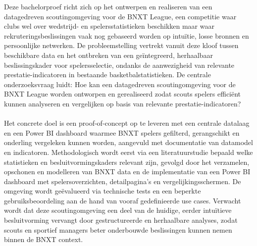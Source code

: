 Deze bachelorproef richt zich op het ontwerpen en realiseren van een datagedreven scoutingomgeving voor de BNXT League, een competitie waar clubs wel over wedstrijd- en spelersstatistieken beschikken maar waar rekruteringsbeslissingen vaak nog gebaseerd worden op intuïtie, losse bronnen en persoonlijke netwerken. De probleemstelling vertrekt vanuit deze kloof tussen beschikbare data en het ontbreken van een geïntegreerd, herhaalbaar beslissingskader voor spelersselectie, ondanks de aanwezigheid van relevante prestatie-indicatoren in bestaande basketbalstatistieken. De centrale onderzoeksvraag luidt: Hoe kan een datagedreven scoutingomgeving voor de BNXT League worden ontworpen en gerealiseerd zodat scouts spelers efficiënt kunnen analyseren en vergelijken op basis van relevante prestatie-indicatoren? 
\\\\
Het concrete doel is een proof‑of‑concept op te leveren met een centrale datalaag en een Power BI dashboard waarmee BNXT spelers gefilterd, gerangschikt en onderling vergeleken kunnen worden, aangevuld met documentatie van datamodel en indicatoren. Methodologisch wordt eerst via een literatuurstudie bepaald welke statistieken en besluitvormingskaders relevant zijn, gevolgd door het verzamelen, opschonen en modelleren van BNXT data en de implementatie van een Power BI dashboard met spelersoverzichten, detailpagina’s en vergelijkingsschermen. De omgeving wordt geëvalueerd via technische tests en een beperkte gebruiksbeoordeling aan de hand van vooraf gedefinieerde use cases. Verwacht wordt dat deze scoutingomgeving een deel van de huidige, eerder intuïtieve besluitvorming vervangt door gestructureerde en herhaalbare analyses, zodat scouts en sportief managers beter onderbouwde beslissingen kunnen nemen binnen de BNXT context.

